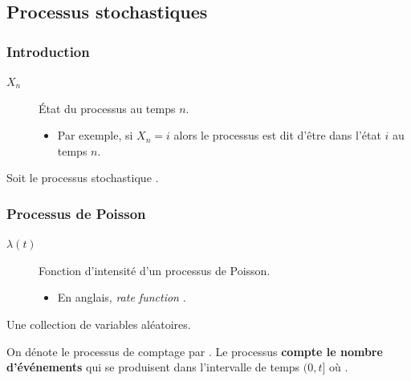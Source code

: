 \documentclass[10pt, french]{article}
\begin{document}
\begin{multicols*}{2}
\pagebreak
\part{Processus stochastiques}
\label{chapt:procStoch}
\section{Introduction}
\begin{distributions}[Notation]
\begin{description}
	\item[$X_{n}$]	État du processus au temps $n$.
		\begin{itemize}
		\item	Par exemple, si $X_{n}	=	i$ alors le processus est dit d'être dans l'état $i$ au temps $n$.
		\end{itemize}
\end{description}
\end{distributions}

\begin{definitionNOHFILL}
Soit le processus stochastique .
\end{definitionNOHFILL}


\columnbreak
\section{Processus de Poisson}
\label{sec:procPois}
\begin{distributions}[Notation]
\begin{description}
	\item[$\lambda(t)$]	Fonction d'intensité d'un processus de Poisson.
		\begin{itemize}
		\item	En anglais, \og \textit{rate function} \fg{}.
		\end{itemize}
\end{description}
\end{distributions}
\begin{definitionNOHFILL}
Une collection de variables aléatoires.
\end{definitionNOHFILL}

\begin{definitionNOHFILLsub}
On dénote le processus de comptage par . Le processus \textbf{compte le nombre d'événements} qui se produisent dans l'intervalle de temps $(0, t]$ où .\\


\end{definitionNOHFILLsub}
\end{multicols*}
\end{document}
